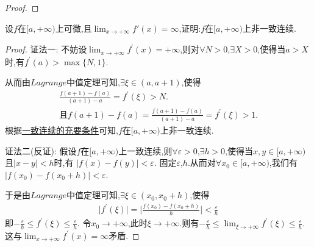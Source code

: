 \documentclass[lang=cn,newtx,10pt,scheme=chinese]{../Template/elegantbook}
\begin{document}
\begin{proof}
\end{proof}

\begin{exercise}
    设\(f\)在\([a, +\infty)\)上可微,且\(\lim_{x \to +\infty} f'(x) = \infty\),证明:\(f\)在\([a, +\infty)\)上非一致连续.
\end{exercise}
\begin{proof}
    {\color{blue}证法一:}
    不妨设\(\lim_{x\rightarrow +\infty} f^{\prime}(x)=+\infty\),则对\(\forall N > 0\),\(\exists X > 0\),使得当\(a > X\)时,有\(f^{\prime}(a) > \max\{N, 1\}\).

从而由\(Lagrange\)中值定理可知,\(\exists \xi \in (a, a + 1)\),使得
\begin{gather*}
   \frac{f(a + 1) - f(a)}{(a + 1) - a}=f^{\prime}(\xi) > N.
   \\
   \text{且}f(a + 1) - f(a)=\frac{f(a + 1) - f(a)}{(a + 1) - a}=f^{\prime}(\xi) > 1.
\end{gather*}
    根据\hyperref[pro:一致连续的充要条件1]{一致连续的充要条件}可知,\(f\)在\([a, +\infty)\)上非一致连续.

    {\color{blue}证法二(反证):}
    假设\(f\)在\([a, +\infty)\)上一致连续,则\(\forall \varepsilon > 0\),\(\exists h > 0\),使得当\(x,y\in [a, +\infty)\)且\(\vert x - y\vert < h\)时,有
    \(\vert f(x) - f(y)\vert < \varepsilon\).
固定\(\varepsilon\),\(h\).从而对\(\forall x_0\in [a, +\infty)\),我们有\(\vert f(x_0) - f(x_0 + h)\vert < \varepsilon\).

于是由\(Lagrange\)中值定理可知,\(\exists \xi \in (x_0, x_0 + h)\),使得
\begin{align*}
    \vert f^{\prime}(\xi)\vert=\vert\frac{f(x_0) - f(x_0 + h)}{h}\vert < \frac{\varepsilon}{h}
\end{align*}
即\(-\frac{\varepsilon}{h}\leqslant f^{\prime}(\xi) \leqslant \frac{\varepsilon}{h}\).
令\(x_0\rightarrow +\infty\),此时\(\xi \rightarrow +\infty\).则有\(-\frac{\varepsilon}{h}\leqslant \lim_{\xi \rightarrow +\infty}f^{\prime}(\xi) \leqslant \frac{\varepsilon}{h}\).这与\(\lim_{x\rightarrow +\infty}f^{\prime}(x) =\infty\)矛盾.

\end{proof}
\end{document}
